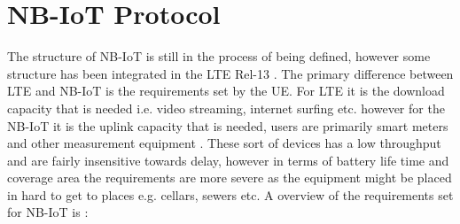 \chapter{NB-IoT Protocol}\label{ch:NB-IoT}

The structure of \gls{NB-IoT} is still in the process of being defined, however some structure has been integrated in the \gls{LTE} Rel-13 \citep{REL-13}. The primary difference between \gls{LTE} and \gls{NB-IoT} is the requirements set by the \gls{UE}. For \gls{LTE} it is the download capacity that is needed i.e. video streaming, internet surfing etc. however for the \gls{NB-IoT} it is the uplink capacity that is needed, users are primarily smart meters and other measurement equipment \citep{primer}. These sort of devices has a low throughput and are fairly insensitive towards delay, however in terms of battery life time and coverage area the requirements are more severe as the equipment might be placed in hard to get to places e.g. cellars, sewers etc. A overview of the requirements set for \gls{NB-IoT} is \citep{NB-IoT_Book}:

